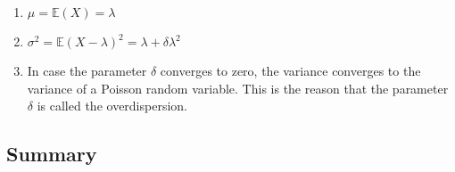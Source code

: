 \begin{enumerate}
    \item $\mu = \mathbb{E}(X) = \lambda$
    \hfill \cite{statistics/book/Statistics-for-Data-Scientists/Maurits-Kaptein}

    \item $\sigma^2 = \mathbb{E}(X - \lambda)^2 = \lambda + \delta\lambda^2$
    \hfill \cite{statistics/book/Statistics-for-Data-Scientists/Maurits-Kaptein}

    \item In case the parameter $\delta$ converges to zero, the variance converges to the variance of a Poisson random variable.
    This is the reason that the parameter $\delta$ is called the overdispersion.
\end{enumerate}




\subsection{Summary}

